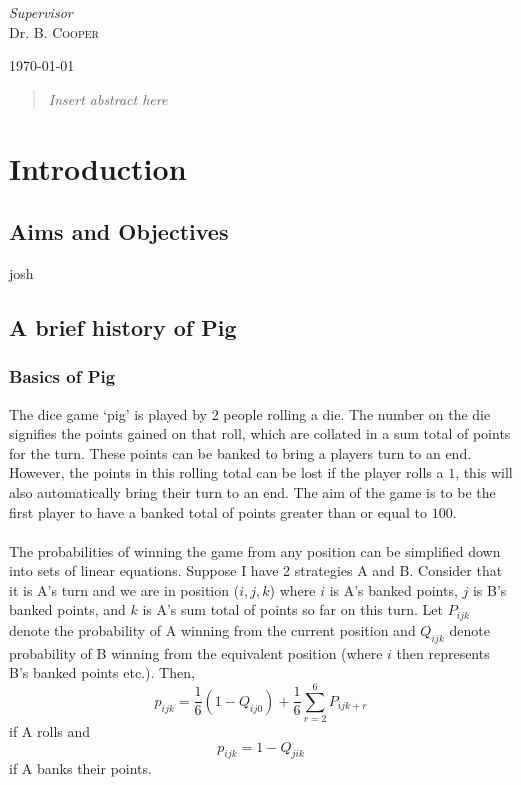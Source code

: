 \documentclass[a4paper,titlepage]{article}
\begin{document}
\begin{titlepage}
	\vfill\vfill
	\textit{Supervisor}\\
	Dr. B. \textsc{Cooper}


	\vfill\vfill\vfill

	{\large\today}
	\vfill


	\newpage
	\begin{abstract}
	\textit{Insert abstract here}
	\end{abstract}
\end{titlepage}


\tableofcontents
\newpage

\section{Introduction}

\subsection{Aims and Objectives}
josh
\subsection{A brief history of Pig}
\subsubsection{Basics of Pig}
The dice game `pig' is played by 2 people rolling a die. The number on the die signifies the points gained on that roll, which are collated in a sum total of points for the turn. These points can be banked to bring a players turn to an end. However, the points in this rolling total can be lost if the player rolls a $1$, this will also automatically bring their turn to an end. The aim of the game is to be the first player to have a banked total of points greater than or equal to $100$.
\\
\\
The probabilities of winning the game from any position can be simplified down into sets of linear equations. Suppose I have 2 strategies A and B. Consider that it is A's turn and we are in position ($i,j,k$) where $i$ is A's banked points, $j$ is B's banked points, and $k$ is A's sum total of points so far on this turn. Let $P_{ijk}$ denote the probability of A winning from the current position and $Q_{ijk}$ denote probability of B winning from the equivalent position (where $i$ then represents B's banked points etc.). Then, \begin{equation}\label{1.2.1.a}
p_{ijk} = \dfrac{1}{6} (1-Q_{ij0}) + \dfrac{1}{6}\sum^{6}_{r=2}P_{ijk+r}
\end{equation}
 if A rolls and
 \begin{equation}\label{1.2.1.b}
 p_{ijk} = 1-Q_{jik}
 \end{equation} 
 if A banks their points.
\end{document}
